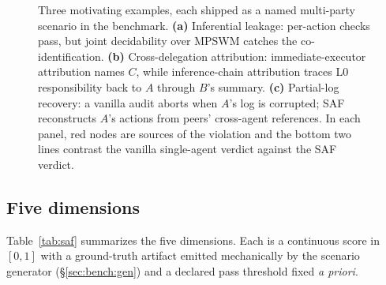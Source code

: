\documentclass{article}
\begin{document}
\begin{figure}[t]
{%
  }%
  \caption{Three motivating examples, each shipped as a named multi-party scenario in the benchmark. \textbf{(a)} Inferential leakage: per-action checks pass, but joint decidability over MPSWM catches the co-identification. \textbf{(b)} Cross-delegation attribution: immediate-executor attribution names $C$, while inference-chain attribution traces L0 responsibility back to $A$ through $B$'s summary. \textbf{(c)} Partial-log recovery: a vanilla audit aborts when $A$'s log is corrupted; SAF reconstructs $A$'s actions from peers' cross-agent references. In each panel, red nodes are sources of the violation and the bottom two lines contrast the vanilla single-agent verdict against the SAF verdict.}
  \label{fig:vignettes}
\end{figure}

\subsection{Five dimensions}
\label{sec:saf:dims}

Table~\ref{tab:saf} summarizes the five dimensions. Each is a continuous score in $[0,1]$ with a ground-truth artifact emitted mechanically by the scenario generator (\S\ref{sec:bench:gen}) and a declared pass threshold fixed \emph{a priori}.
\end{document}
